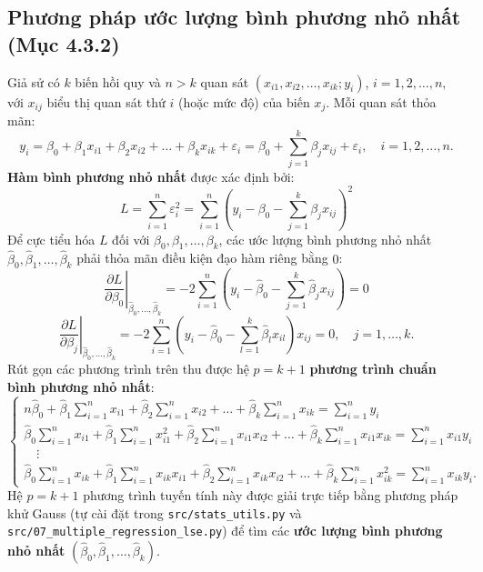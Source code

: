 \documentclass[12pt,a4paper]{report}
\begin{document}
\subsection{Phương pháp ước lượng bình phương nhỏ nhất (Mục 4.3.2)}
Giả sử có $k$ biến hồi quy và $n > k$ quan sát $(x_{i1}, x_{i2}, \dots, x_{ik}; y_i)$, $i = 1, 2, \dots, n$, với $x_{ij}$ biểu thị quan sát thứ $i$ (hoặc mức độ) của biến $x_j$. Mỗi quan sát thỏa mãn:
\[
    y_i = \beta_0 + \beta_1 x_{i1} + \beta_2 x_{i2} + \dots + \beta_k x_{ik} + \varepsilon_i = \beta_0 + \sum_{j=1}^{k} \beta_j x_{ij} + \varepsilon_i, \quad i = 1, 2, \dots, n.
\]
\textbf{Hàm bình phương nhỏ nhất} được xác định bởi:
\[
    L = \sum_{i=1}^{n} \varepsilon_i^2 = \sum_{i=1}^{n} \left( y_i - \beta_0 - \sum_{j=1}^{k} \beta_j x_{ij} \right)^2
\]
Để cực tiểu hóa $L$ đối với $\beta_0, \beta_1, \dots, \beta_k$, các ước lượng bình phương nhỏ nhất $\hat{\beta}_0, \hat{\beta}_1, \dots, \hat{\beta}_k$ phải thỏa mãn điều kiện đạo hàm riêng bằng $0$:
\[
    \left.\frac{\partial L}{\partial \beta_0}\right|_{\hat{\beta}_0, \dots, \hat{\beta}_k} = -2\sum_{i=1}^{n}\left( y_i - \hat{\beta}_0 - \sum_{j=1}^{k} \hat{\beta}_j x_{ij} \right) = 0
\]
\[
    \left.\frac{\partial L}{\partial \beta_j}\right|_{\hat{\beta}_0, \dots, \hat{\beta}_k} = -2\sum_{i=1}^{n}\left( y_i - \hat{\beta}_0 - \sum_{l=1}^{k} \hat{\beta}_l x_{il} \right) x_{ij} = 0, \quad j = 1, \dots, k.
\]
Rút gọn các phương trình trên thu được hệ $p = k + 1$ \textbf{phương trình chuẩn bình phương nhỏ nhất}:
\[
\begin{cases}
    n\hat{\beta}_0 + \hat{\beta}_1 \sum_{i=1}^n x_{i1} + \hat{\beta}_2 \sum_{i=1}^n x_{i2} + \dots + \hat{\beta}_k \sum_{i=1}^n x_{ik} = \sum_{i=1}^n y_i \\
    \hat{\beta}_0 \sum_{i=1}^n x_{i1} + \hat{\beta}_1 \sum_{i=1}^n x_{i1}^2 + \hat{\beta}_2 \sum_{i=1}^n x_{i1}x_{i2} + \dots + \hat{\beta}_k \sum_{i=1}^n x_{i1}x_{ik} = \sum_{i=1}^n x_{i1}y_i \\
    \quad \vdots \\
    \hat{\beta}_0 \sum_{i=1}^n x_{ik} + \hat{\beta}_1 \sum_{i=1}^n x_{ik}x_{i1} + \hat{\beta}_2 \sum_{i=1}^n x_{ik}x_{i2} + \dots + \hat{\beta}_k \sum_{i=1}^n x_{ik}^2 = \sum_{i=1}^n x_{ik}y_i.
\end{cases}
\]
Hệ $p = k + 1$ phương trình tuyến tính này được giải trực tiếp bằng phương pháp khử Gauss (tự cài đặt trong \texttt{src/stats\_utils.py} và \texttt{src/07\_multiple\_regression\_lse.py}) để tìm các \textbf{ước lượng bình phương nhỏ nhất} $(\hat{\beta}_0, \hat{\beta}_1, \dots, \hat{\beta}_k)$.
\end{document}
